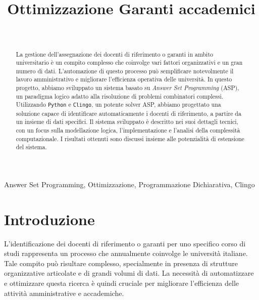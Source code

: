 \documentclass[draft, journal, onecolumn]{IEEEtran}
\begin{document}
\title{Ottimizzazione Garanti accademici}

\author{
\\
\and
{}
}

\maketitle

\begin{abstract} La gestione dell'assegnazione dei docenti di riferimento o
	garanti in ambito universitario è un compito complesso che coinvolge vari
	fattori organizzativi e un gran numero di dati. L'automazione di questo
	processo può semplificare notevolmente il lavoro amministrativo e migliorare
	l'efficienza operativa delle università. In questo progetto, abbiamo
	sviluppato un sistema basato su \textit{Answer Set Programming} (ASP), un
	paradigma logico adatto alla risoluzione di problemi combinatori complessi.
	Utilizzando \texttt{Python} e \texttt{Clingo}, un potente solver ASP, abbiamo
	progettato una soluzione capace di identificare automaticamente i docenti di
	riferimento, a partire da un insieme di dati specifici. Il sistema sviluppato
	è descritto nei suoi dettagli tecnici, con un focus sulla modellazione logica,
	l'implementazione e l'analisi della complessità computazionale. I risultati
	ottenuti sono discussi insieme alle potenzialità di estensione del sistema.
\end{abstract}

\begin{IEEEkeywords}
Answer Set Programming, Ottimizzazione, Programmazione Dichiarativa, Clingo
\end{IEEEkeywords}

\section{Introduzione} L'identificazione dei docenti di riferimento o garanti
per uno specifico corso di studi rappresenta un processo che annualmente
coinvolge le università italiane. Tale compito può risultare complesso,
specialmente in presenza di strutture organizzative articolate e di grandi
volumi di dati. La necessità di automatizzare e ottimizzare questa ricerca è
quindi cruciale per migliorare l'efficienza delle attività amministrative e
accademiche.
\end{document}
